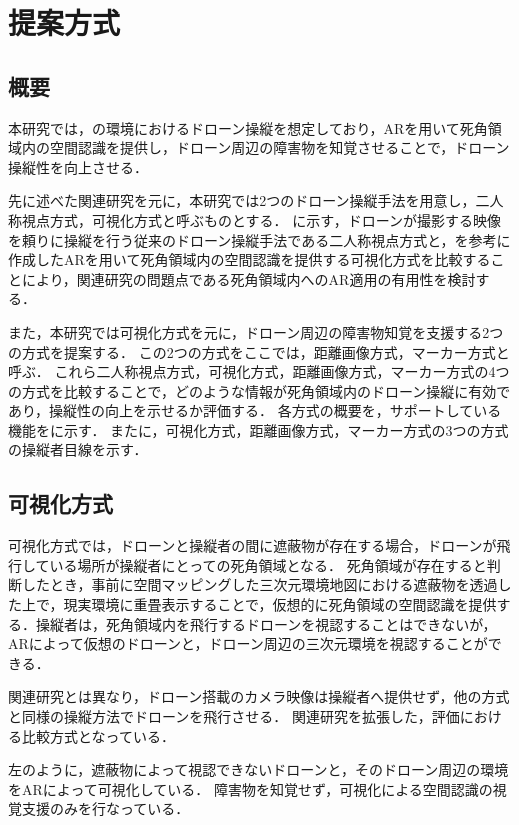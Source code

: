 \documentclass[submit, sigrecommended]{ipsj}
\begin{document}

\section{提案方式}
\subsection{概要}
本研究では，の環境におけるドローン操縦を想定しており，ARを用いて死角領域内の空間認識を提供し，ドローン周辺の障害物を知覚させることで，ドローン操縦性を向上させる．
\par
先に述べた関連研究\cite{article-ar05}を元に，本研究では2つのドローン操縦手法を用意し，二人称視点方式，可視化方式と呼ぶものとする．
に示す，ドローンが撮影する映像を頼りに操縦を行う従来のドローン操縦手法である二人称視点方式と，を参考に作成したARを用いて死角領域内の空間認識を提供する可視化方式を比較することにより，関連研究の問題点である死角領域内へのAR適用の有用性を検討する．

また，本研究では可視化方式を元に，ドローン周辺の障害物知覚を支援する2つの方式を提案する．
この2つの方式をここでは，距離画像方式，マーカー方式と呼ぶ．
これら二人称視点方式，可視化方式，距離画像方式，マーカー方式の4つの方式を比較することで，どのような情報が死角領域内のドローン操縦に有効であり，操縦性の向上を示せるか評価する．
各方式の概要を，サポートしている機能をに示す．
またに，可視化方式，距離画像方式，マーカー方式の3つの方式の操縦者目線を示す．

\subsection{可視化方式}
可視化方式では，ドローンと操縦者の間に遮蔽物が存在する場合，ドローンが飛行している場所が操縦者にとっての死角領域となる．
死角領域が存在すると判断したとき，事前に空間マッピングした三次元環境地図における遮蔽物を透過した上で，現実環境に重畳表示することで，仮想的に死角領域の空間認識を提供する．操縦者は，死角領域内を飛行するドローンを視認することはできないが，ARによって仮想のドローンと，ドローン周辺の三次元環境を視認することができる．
\par
関連研究\cite{article-ar05}とは異なり，ドローン搭載のカメラ映像は操縦者へ提供せず，他の方式と同様の操縦方法でドローンを飛行させる．
関連研究を拡張した，評価における比較方式となっている．
\par
{}左のように，遮蔽物によって視認できないドローンと，そのドローン周辺の環境をARによって可視化している．
障害物を知覚せず，可視化による空間認識の視覚支援のみを行なっている．
\end{document}

